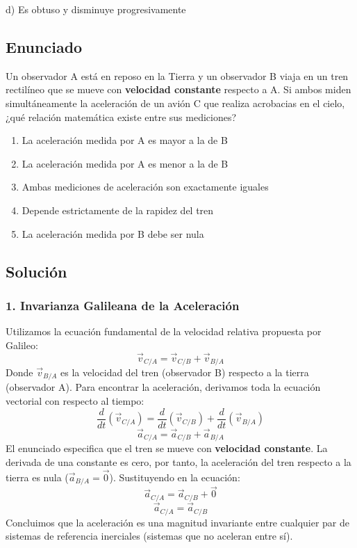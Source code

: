 \documentclass[12pt, a4paper]{article}
\begin{document}
\begin{tcolorbox}[colback=green!5!white, colframe=green!50!black, title=Respuesta Final]
\centering \Large d) Es obtuso y disminuye progresivamente
\end{tcolorbox}

\newpage

\subsection*{Enunciado}
Un observador A está en reposo en la Tierra y un observador B viaja en un tren rectilíneo que se mueve con \textbf{velocidad constante} respecto a A. Si ambos miden simultáneamente la aceleración de un avión C que realiza acrobacias en el cielo, ¿qué relación matemática existe entre sus mediciones?
\begin{enumerate}[label=\alph*)]
    \item La aceleración medida por A es mayor a la de B
    \item La aceleración medida por A es menor a la de B
    \item Ambas mediciones de aceleración son exactamente iguales
    \item Depende estrictamente de la rapidez del tren
    \item La aceleración medida por B debe ser nula
\end{enumerate}

\subsection*{Solución}

\subsubsection*{1. Invarianza Galileana de la Aceleración}
Utilizamos la ecuación fundamental de la velocidad relativa propuesta por Galileo:
$$ \vec{v}_{C/A} = \vec{v}_{C/B} + \vec{v}_{B/A} $$
Donde $\vec{v}_{B/A}$ es la velocidad del tren (observador B) respecto a la tierra (observador A).
Para encontrar la aceleración, derivamos toda la ecuación vectorial con respecto al tiempo:
$$ \frac{d}{dt}(\vec{v}_{C/A}) = \frac{d}{dt}(\vec{v}_{C/B}) + \frac{d}{dt}(\vec{v}_{B/A}) $$
$$ \vec{a}_{C/A} = \vec{a}_{C/B} + \vec{a}_{B/A} $$
El enunciado especifica que el tren se mueve con \textbf{velocidad constante}. La derivada de una constante es cero, por tanto, la aceleración del tren respecto a la tierra es nula ($\vec{a}_{B/A} = \vec{0}$).
Sustituyendo en la ecuación:
$$ \vec{a}_{C/A} = \vec{a}_{C/B} + \vec{0} $$
$$ \vec{a}_{C/A} = \vec{a}_{C/B} $$
Concluimos que la aceleración es una magnitud invariante entre cualquier par de sistemas de referencia inerciales (sistemas que no aceleran entre sí).
\end{document}
